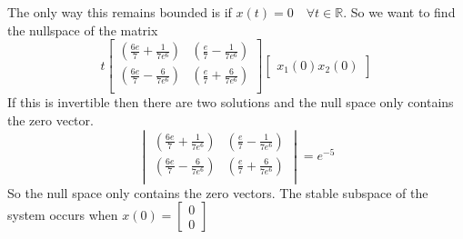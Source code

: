 \documentclass{article}
\begin{document}
The only way this remains bounded is if $x(t) = 0 \quad \forall t \in \mathbb{R}$.
So we want to find the nullspace of the matrix
$$
t
\begin{bmatrix}
\left(\frac{6 e }{7}+\frac{1}{7 e^6}\right) & \left(\frac{e}{7}-\frac{1}{7 e^6}\right) \\
\left(\frac{6 e }{7}-\frac{6}{7 e^6}\right) & \left(\frac{e}{7}+\frac{6}{7 e^6}\right) \\
\end{bmatrix}
\begin{bmatrix}
x_1(0)
x_2(0)
\end{bmatrix}
$$
If this is invertible then there are two solutions and the null space only contains the zero vector.
$$
\begin{vmatrix}
\left(\frac{6 e }{7}+\frac{1}{7 e^6}\right) & \left(\frac{e}{7}-\frac{1}{7 e^6}\right) \\
\left(\frac{6 e }{7}-\frac{6}{7 e^6}\right) & \left(\frac{e}{7}+\frac{6}{7 e^6}\right) \\
\end{vmatrix}
=
e^{-5}
$$
So the null space only contains the zero vectors.
\newline
The stable subspace of the system occurs when $x(0) = \begin{bmatrix} 0 \\ 0 \end{bmatrix}$
\end{document}
